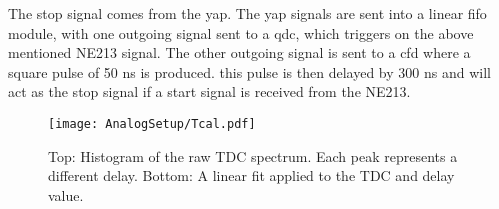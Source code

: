 \documentclass[main.tex]{subfiles}
\begin{document}
The stop signal comes from the yap. The yap signals are sent into a linear fifo module, with one outgoing signal sent to a qdc, which triggers on the above mentioned NE213 signal. %
The other outgoing signal is sent to a cfd where a square pulse of 50 ns is produced. this pulse is then delayed by 300 ns and will act as the stop signal if a start signal is received from the NE213. %

\begin{figure}[ht]
	\centering
    	\texttt{[image: AnalogSetup/Tcal.pdf]}
        \caption{Top: Histogram of the raw TDC spectrum. Each peak represents a different delay. Bottom: A linear fit applied to the TDC and delay value.}
	    \label{fig:Tcal} 
\end{figure}
\end{document}
